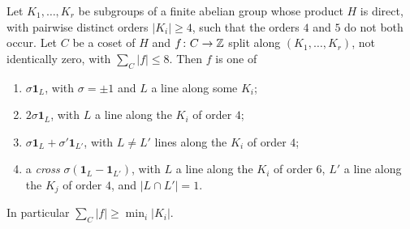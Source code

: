 \begin{lemma}\label{lem:S}
Let $K_{1},\dots,K_{r}$ be subgroups of a finite abelian group whose product
$H$ is direct, with pairwise distinct orders $|K_{i}|\ge4$, such that the
orders $4$ and $5$ do not both occur. Let $C$ be a coset of $H$ and $f\colon
C\to\mathbb{Z}$ split along $(K_{1},\dots,K_{r})$, not identically zero, with
$\sum_{C}|f|\le8$. Then $f$ is one of
\begin{enumerate}[label=\textup{(\roman*)}]
\item $\sigma\mathbf 1_{L}$, with $\sigma=\pm1$ and $L$ a line along some
$K_{i}$;
\item $2\sigma\mathbf 1_{L}$, with $L$ a line along the $K_{i}$ of order $4$;
\item $\sigma\mathbf 1_{L}+\sigma'\mathbf 1_{L'}$, with $L\ne L'$ lines along
the $K_{i}$ of order $4$;
\item a \emph{cross} $\sigma(\mathbf 1_{L}-\mathbf 1_{L'})$, with $L$ a line
along the $K_{i}$ of order $6$, $L'$ a line along the $K_{j}$ of order $4$, and
$|L\cap L'|=1$.
\end{enumerate}
In particular $\sum_{C}|f|\ge\min_{i}|K_{i}|$.
\end{lemma}

